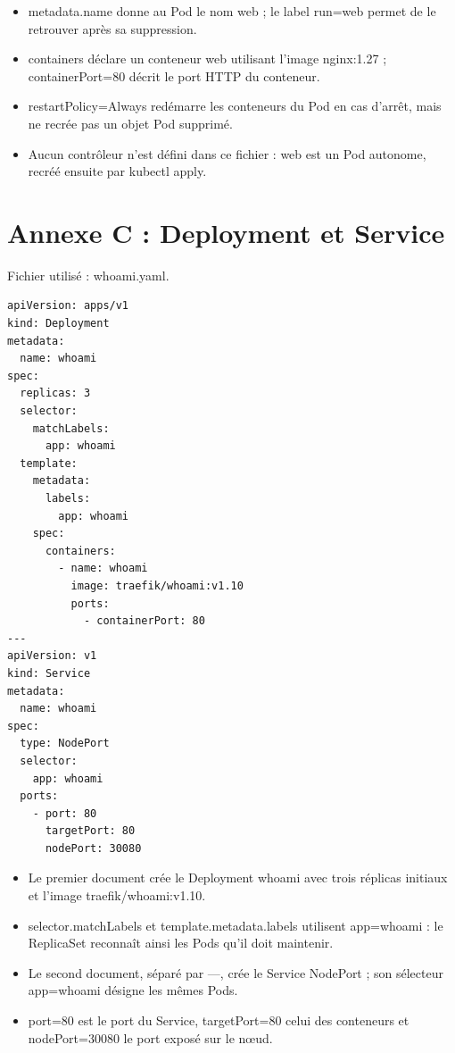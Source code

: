 \documentclass[11pt,a4paper]{article}
\begin{document}
\begin{itemize}
\item metadata.name donne au Pod le nom web ; le label run=web permet de le retrouver après sa suppression.
\item containers déclare un conteneur web utilisant l'image nginx:1.27 ; containerPort=80 décrit le port HTTP du conteneur.
\item restartPolicy=Always redémarre les conteneurs du Pod en cas d'arrêt, mais ne recrée pas un objet Pod supprimé.
\item Aucun contrôleur n'est défini dans ce fichier : web est un Pod autonome, recréé ensuite par kubectl apply.
\end{itemize}

\clearpage
\section*{Annexe C : Deployment et Service}

Fichier utilisé : whoami.yaml.

\par\vspace{4pt}\noindent\begin{minipage}{\linewidth}
\begin{Verbatim}[breaklines=true,breakanywhere=true,fontsize=\footnotesize,frame=single,framesep=8pt,rulecolor=\color{teal}]
apiVersion: apps/v1
kind: Deployment
metadata:
  name: whoami
spec:
  replicas: 3
  selector:
    matchLabels:
      app: whoami
  template:
    metadata:
      labels:
        app: whoami
    spec:
      containers:
        - name: whoami
          image: traefik/whoami:v1.10
          ports:
            - containerPort: 80
---
apiVersion: v1
kind: Service
metadata:
  name: whoami
spec:
  type: NodePort
  selector:
    app: whoami
  ports:
    - port: 80
      targetPort: 80
      nodePort: 30080
\end{Verbatim}
\end{minipage}\par\vspace{6pt}


\begin{itemize}
\item Le premier document crée le Deployment whoami avec trois réplicas initiaux et l'image traefik/whoami:v1.10.
\item selector.matchLabels et template.metadata.labels utilisent app=whoami : le ReplicaSet reconnaît ainsi les Pods qu'il doit maintenir.
\item Le second document, séparé par ---, crée le Service NodePort ; son sélecteur app=whoami désigne les mêmes Pods.
\item port=80 est le port du Service, targetPort=80 celui des conteneurs et nodePort=30080 le port exposé sur le nœud.
\end{itemize}
\end{document}

